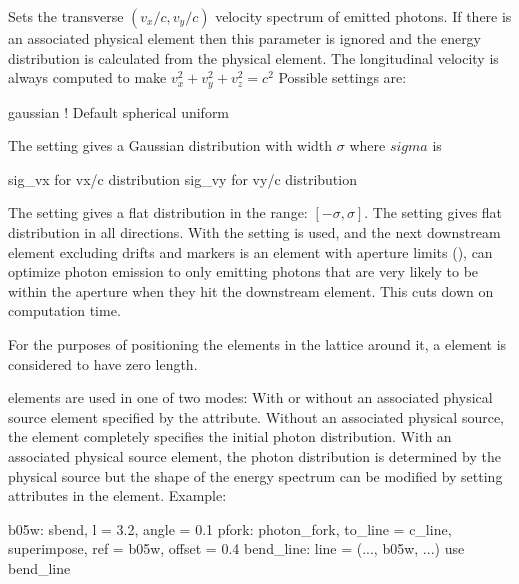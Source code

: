 {\begin{description}
  \item[\vn{velocity_distribution}] \Newline
Sets the transverse $(v_x/c, v_y/c)$ velocity spectrum of emitted
photons. If there is an associated physical element then this
parameter is ignored and the energy distribution is calculated from
the physical element. The longitudinal velocity is always computed to
make $v_x^2 + v_y^2 + v_z^2 = c^2$ Possible settings are:
\begin{example2}
  gaussian    ! Default
  spherical
  uniform
\end{example2}
The  setting gives a Gaussian distribution with width
$\sigma$ where $sigma$ is 
\begin{example2}
  sig_vx     for vx/c distribution
  sig_vy     for vy/c distribution
\end{example2}
The  setting gives a flat distribution in the range: $[-\sigma, \sigma]$. The
 setting gives flat distribution in all directions. With the 
setting is used, and the next downstream element excluding drifts and markers is an element
with aperture limits (), \bmad can optimize photon emission to only emitting 
photons that are very likely to be within the aperture when they hit the downstream element.
This cuts down on computation time.

  \end{description}

For the purposes of positioning the elements in the lattice around it,
a  element is considered to have zero length.

 elements are used in one of two modes: With or
without an associated physical source element specified by the
 attribute. Without an associated physical source,
the  element completely specifies the initial photon
distribution. With an associated physical source element, the photon
distribution is determined by the physical source but the shape of the
energy spectrum can be modified by setting attributes in the
 element. Example:
\begin{example}
  b05w: sbend, l = 3.2, angle = 0.1
  pfork: photon_fork, to_line = c_line, superimpose, ref = b05w, offset = 0.4
  bend_line: line = (..., b05w, ...)
  use bend_line


\end{example}}
